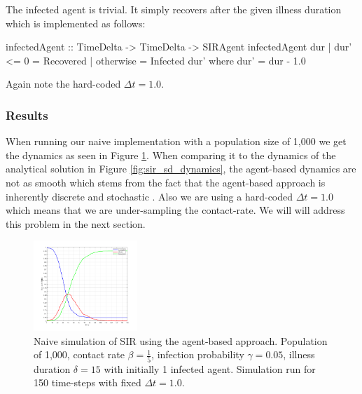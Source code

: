 The infected agent is trivial. It simply recovers after the given illness duration which is implemented as follows:

\begin{HaskellCode}
infectedAgent :: TimeDelta -> TimeDelta -> SIRAgent
infectedAgent dur
    | dur' <= 0 = Recovered
    | otherwise = Infected dur'
  where
    dur' = dur - 1.0  
\end{HaskellCode}

Again note the hard-coded $\Delta t = 1.0$.

\subsubsection{Results}
When running our naive implementation with a population size of 1,000 we get the dynamics as seen in Figure \ref{fig:sir_abs_dynamics_naive}. When comparing it to the dynamics of the analytical solution in Figure \ref{fig:sir_sd_dynamics}, the agent-based dynamics are not as smooth which stems from the fact that the agent-based approach is inherently discrete and stochastic \cite{macal_agent-based_2010}. Also we are using a hard-coded $\Delta t = 1.0$ which means that we are under-sampling the contact-rate. We will will address this problem in the next section.

\begin{figure}
	\centering
	\includegraphics[width=0.35\textwidth, angle=0]{./fig/step1_randmonad/SIR_1000agents_150t_1dt.png}
	\caption{Naive simulation of SIR using the agent-based approach. Population of 1,000, contact rate $\beta = \frac{1}{5}$, infection probability $\gamma = 0.05$, illness duration $\delta = 15$ with initially 1 infected agent. Simulation run for 150 time-steps with fixed $\Delta t = 1.0$.}
	\label{fig:sir_abs_dynamics_naive}
\end{figure}

    	

